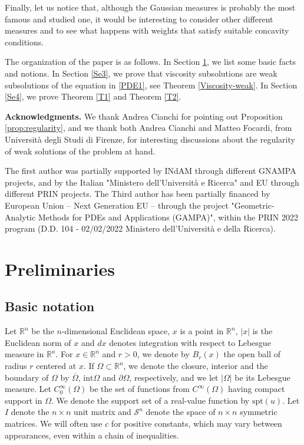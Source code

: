 \documentclass[12pt]{amsart}
\newcommand{\R}{\mathbb R}
\newcommand{\1}{\mathbf 1}
\begin{document}
{  Finally, let us notice that, although the Gaussian measures is probably the most famous and studied one, it would be interesting to consider other different measures and to see what happens with weights that satisfy suitable concavity conditions. }


\medskip

The organization of the paper is as follows. In Section \ref{Se2}, we list some basic facts and notions. In Section \ref{Se3}, we prove that viscosity subsolutions are weak subsolutions of the equation in \eqref{PDE1}, see Theorem \ref{Viscosity-weak}. In Section \ref{Se4}, we prove Theorem \ref{T1} and Theorem \ref{T2}.

\medskip

{\bf Acknowledgments.} We thank Andrea Cianchi for pointing out Proposition \ref{prop:regularity}, and we thank both Andrea Cianchi and Matteo Focardi, from Universit\`a degli Studi di Firenze, for interesting discussions about the regularity of weak solutions of the problem at hand.

The first author was partially supported by INdAM through different GNAMPA projects, and by the Italian "Ministero dell'Universit\`a e Ricerca" and EU through different PRIN projects. The Third author has been partially financed by European Union -- Next Generation EU -- through the project "Geometric-Analytic Methods for PDEs and Applications (GAMPA)", within the PRIN 2022 program (D.D. 104 - 02/02/2022 Ministero dell'Universit\`a e della Ricerca).

\section{Preliminaries}\label{Se2}

\subsection{Basic notation}

Let $\mathbb{R}^n$ be the $n$-dimensional Euclidean space, $x$ is a point in $\R^n$, $|x|$ is the Euclidean norm of $x$ and $dx$ denotes integration with respect to Lebesgue measure in $\R^n$. For $x\in \R^n$ and $r>0$, we denote by $B_{r}(x)$ the open ball of radius $r$ centered at $x$. If $\Omega\subset \R^n$, we denote the closure, interior and the boundary of $\Omega$ by $\overline{\Omega}$, $\mathrm{int} \Omega$ and $\partial \Omega$, respectively, and we let $|\Omega|$ be its Lebesgue measure. Let $C_{0}^{\infty}(\Omega)$ be the set of functions from $C^{\infty}(\Omega)$ having compact support in $\Omega$. We denote the support set of a real-value function by $\mathrm{spt}(u)$. Let $I$ denote the $n\times n$ unit matrix and $\mathcal{S}^n$ denote the space of $n\times n$ symmetric matrices. We will often use $c$ for positive constants, which may vary between appearances, even within a chain of inequalities.
\end{document}
